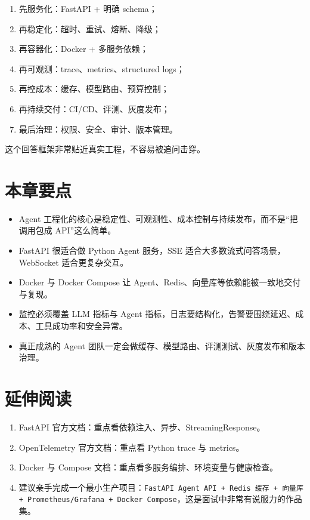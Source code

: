 \begin{enumerate}[leftmargin=2em]
\item 先服务化：FastAPI + 明确 schema；
\item 再稳定化：超时、重试、熔断、降级；
\item 再容器化：Docker + 多服务依赖；
\item 再可观测：trace、metrics、structured logs；
\item 再控成本：缓存、模型路由、预算控制；
\item 再持续交付：CI/CD、评测、灰度发布；
\item 最后治理：权限、安全、审计、版本管理。
\end{enumerate}

这个回答框架非常贴近真实工程，不容易被追问击穿。


\section{本章要点}

\begin{itemize}[leftmargin=2em]
\item Agent 工程化的核心是稳定性、可观测性、成本控制与持续发布，而不是``把调用包成 API''这么简单。
\item FastAPI 很适合做 Python Agent 服务，SSE 适合大多数流式问答场景，WebSocket 适合更复杂交互。
\item Docker 与 Docker Compose 让 Agent、Redis、向量库等依赖能被一致地交付与复现。
\item 监控必须覆盖 LLM 指标与 Agent 指标，日志要结构化，告警要围绕延迟、成本、工具成功率和安全异常。
\item 真正成熟的 Agent 团队一定会做缓存、模型路由、评测测试、灰度发布和版本治理。
\end{itemize}

\section{延伸阅读}

\begin{enumerate}[leftmargin=2em]
\item FastAPI 官方文档：重点看依赖注入、异步、StreamingResponse。
\item OpenTelemetry 官方文档：重点看 Python trace 与 metrics。
\item Docker 与 Compose 文档：重点看多服务编排、环境变量与健康检查。
\item 建议亲手完成一个最小生产项目：\texttt{FastAPI Agent API + Redis 缓存 + 向量库 + Prometheus/Grafana + Docker Compose}，这是面试中非常有说服力的作品集。
\end{enumerate}
